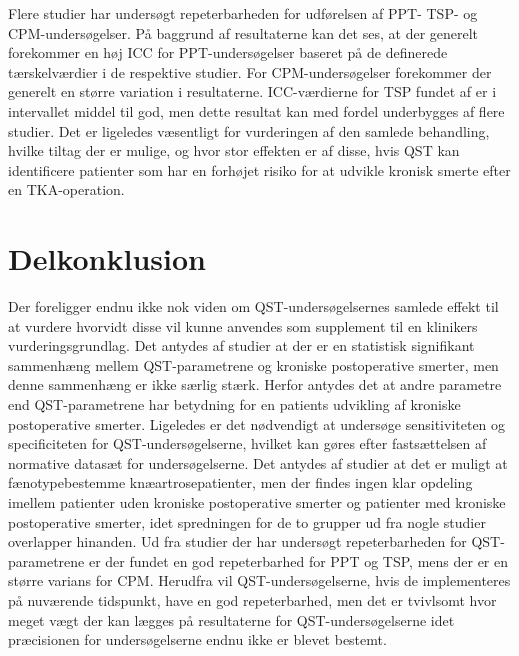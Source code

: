 Flere studier har undersøgt repeterbarheden for udførelsen af PPT- TSP- og CPM-undersøgelser. På baggrund af resultaterne kan det ses, at der generelt forekommer en høj ICC for PPT-undersøgelser baseret på de definerede tærskelværdier i de respektive studier. For CPM-undersøgelser forekommer der generelt en større variation i resultaterne. ICC-værdierne for TSP fundet af  er i intervallet middel til god, men dette resultat kan med fordel underbygges af flere studier. 
Det er ligeledes væsentligt for vurderingen af den samlede behandling, hvilke tiltag der er mulige, og hvor stor effekten er af disse, hvis QST kan identificere patienter som har en forhøjet risiko for at udvikle kronisk smerte efter en TKA-operation.

\section{Delkonklusion}
Der foreligger endnu ikke nok viden om QST-undersøgelsernes samlede effekt til at vurdere hvorvidt disse vil kunne anvendes som supplement til en klinikers vurderingsgrundlag. Det antydes af studier at der er en statistisk signifikant sammenhæng mellem QST-parametrene og kroniske postoperative smerter, men denne sammenhæng er ikke særlig stærk. Herfor antydes det at andre parametre end QST-parametrene har betydning for en patients udvikling af kroniske postoperative smerter. Ligeledes er det nødvendigt at undersøge sensitiviteten og specificiteten for QST-undersøgelserne, hvilket kan gøres efter fastsættelsen af normative datasæt for undersøgelserne. Det antydes af studier at det er muligt at fænotypebestemme knæartrosepatienter, men der findes ingen klar opdeling imellem patienter uden kroniske postoperative smerter og patienter med kroniske postoperative smerter, idet spredningen for de to grupper ud fra nogle studier overlapper hinanden. Ud fra studier der har undersøgt repeterbarheden for QST-parametrene er der fundet en god repeterbarhed for PPT og TSP, mens der er en større varians for CPM. Herudfra vil QST-undersøgelserne, hvis de implementeres på nuværende tidspunkt, have en god repeterbarhed, men det er tvivlsomt hvor meget vægt der kan lægges på resultaterne for QST-undersøgelserne idet præcisionen for undersøgelserne endnu ikke er blevet bestemt. 

